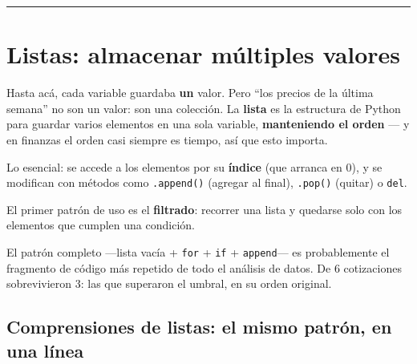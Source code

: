 \documentclass[
  spanish,
  letterpaper,
  DIV=11,
  numbers=noendperiod]{scrreprt}
\newenvironment{Shaded}{\begin{snugshade}}{\end{snugshade}}
\newcommand{\NormalTok}[1]{\textcolor[rgb]{0.00,0.23,0.31}{#1}}
\begin{document}
\begin{center}\rule{0.5\linewidth}{0.5pt}\end{center}

\section{Listas: almacenar múltiples
valores}\label{listas-almacenar-muxfaltiples-valores}

Hasta acá, cada variable guardaba \textbf{un} valor. Pero ``los precios
de la última semana'' no son un valor: son una colección. La
\textbf{lista} es la estructura de Python para guardar varios elementos
en una sola variable, \textbf{manteniendo el orden} --- y en finanzas el
orden casi siempre es tiempo, así que esto importa.

Lo esencial: se accede a los elementos por su \textbf{índice} (que
arranca en 0), y se modifican con métodos como \texttt{.append()}
(agregar al final), \texttt{.pop()} (quitar) o \texttt{del}.

El primer patrón de uso es el \textbf{filtrado}: recorrer una lista y
quedarse solo con los elementos que cumplen una condición.

\begin{Shaded}
\end{Shaded}

El patrón completo ---lista vacía + \texttt{for} + \texttt{if} +
\texttt{append}--- es probablemente el fragmento de código más repetido
de todo el análisis de datos. De 6 cotizaciones sobrevivieron 3: las que
superaron el umbral, en su orden original.

\subsection{Comprensiones de listas: el mismo patrón, en una
línea}\label{comprensiones-de-listas-el-mismo-patruxf3n-en-una-luxednea}
\end{document}
